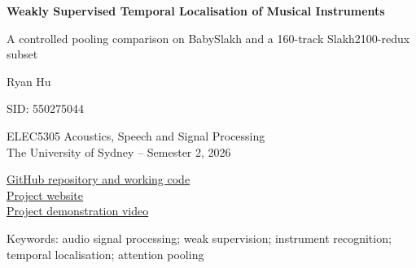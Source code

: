 \documentclass[10pt,a4paper]{article}
\begin{document}
\hypersetup{pageanchor=false}
\begin{titlepage}
\centering
\vspace*{12mm}
{\LARGE\bfseries Weakly Supervised Temporal Localisation of Musical Instruments\par}
\vspace{6mm}
{\large A controlled pooling comparison on BabySlakh and a 160-track Slakh2100-redux subset\par}
\vspace{14mm}
{\large Ryan Hu\par SID: 550275044\par}
\vspace{7mm}
ELEC5305 Acoustics, Speech and Signal Processing\\
The University of Sydney -- Semester 2, 2026
\vspace{10mm}

\href{https://github.com/Decarre/elec5305-project-550275044}{GitHub repository and working code}\\[3mm]
\href{https://decarre.github.io/elec5305-project-550275044/}{Project website}\\[3mm]
\href{https://github.com/Decarre/elec5305-project-550275044/blob/main/output/video/ELEC5305_Slakh160_Presentation_Polished.mp4}{Project demonstration video}
\vspace{10mm}
\begin{abstract}
Can a musical-instrument classifier trained with clip labels recover temporal activity? An initial BabySlakh experiment produced frame micro-F1 near 0.910, below an always-positive baseline at 0.915. A controlled follow-up added stem-remixed absence and transition scenes and compared mean, max and attention pooling across three seeds. A subsequent experiment sampled 160 tracks from the official Slakh2100-redux partitions (120 training, 20 validation and 20 test) and ran each pooling method with one seed. Training used clip labels, with MIDI activity used for temporal calibration and evaluation. In the 160-track experiment, max achieved the highest clip-validation macro balanced accuracy (0.814). Attention achieved the highest test frame macro balanced accuracy on original mixtures (0.707) and across all three variants (0.699), with pooled clip-local event F1 of 0.260. The enlarged experiment uses synthetic audio and a different test set from BabySlakh, leaving real-recording performance and the isolated effect of training-set size open.
\end{abstract}
\vfill
{\small Keywords: audio signal processing; weak supervision; instrument recognition; temporal localisation; attention pooling}
\end{titlepage}
\hypersetup{pageanchor=true}
\tableofcontents
\end{document}
